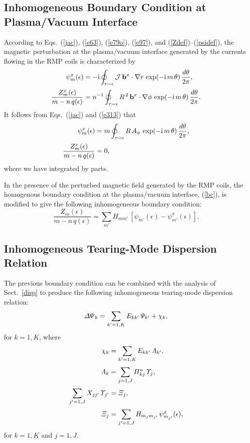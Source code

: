 \documentclass[12pt,prb,aps]{revtex4-1}
\begin{document}
\subsection{Inhomogeneous Boundary Condition at Plasma/Vacuum Interface}
According to Eqs.~(\ref{jac}), (\ref{e63}), (\ref{e79o}), (\ref{e97}), and (\ref{Zdef})--(\ref{psidef}), the magnetic perturbation at the plasma/vacuum
interface generated by the currents flowing in the RMP coils is characterized by
\begin{align}
\psi_m^x(\epsilon) &=-{\rm i}\oint_{r=\epsilon}{\cal J}\,{\bf b}^x\cdot\nabla r\,\exp(-{\rm i}\,m\,\theta)\,\frac{d\theta}{2\pi},\\[0.5ex]
\frac{Z_m^x(\epsilon)}{m-n\,q(\epsilon)}  &= n^{-1}\oint_{r=\epsilon}R^{\,2}\,{\bf b}^x\cdot\nabla \phi\,\exp(-{\rm i}\,m\,\theta)\,\frac{d\theta}{2\pi}.
\end{align}
It follows from Eqs.~(\ref{jac}) and (\ref{e313}) that
\begin{align}
\psi_m^x(\epsilon) &= m \oint_{r=\epsilon}R\,A_\phi\,\exp(-{\rm i}\,m\,\theta)\,\frac{d\theta}{2\pi},\\[0.5ex]
\frac{Z_m^x(\epsilon)}{m-n\,q(\epsilon)}  &= 0,
\end{align}
where we have integrated by parts. 

In the presence of the perturbed magnetic field generated by the RMP coils, the homogenous boundary condition at the plasma/vacuum
interface, (\ref{bc}), is modified to give the following inhomogeneous boundary condition:
\begin{equation}\label{bc1}
\frac{Z_m(\epsilon)}{m-n\,q(\epsilon)} = \sum_{m'} H_{mm'}\,[\psi_{m'}(\epsilon)-\psi_{m'}^x(\epsilon)].
\end{equation}

\subsection{Inhomogeneous Tearing-Mode Dispersion Relation}
The previous boundary condition can be combined with the analysis of Sect.~\ref{disp} to produce the following
inhomogeneous tearing-mode dispersion relation:\,\cite{am3,nelson}
\begin{equation}\label{disp1}
{\mit\Delta\Psi}_k = \sum_{k'=1,K} E_{kk'}\,{\mit\Psi}_{k'} + \chi_k,
\end{equation}
for $k=1,K$, where 
\begin{align}
\chi_k &= \sum_{k'=1,K}E_{kk'}\,{\mit \Lambda}_{k'},\\[0.5ex]
{\mit\Lambda}_{k} &= \sum_{j=1,J} {\mit\Pi}_{kj}^a\,{\mit\Upsilon}_{j},\\[0.5ex]
\sum_{j'=1,J} X_{jj'}\,{\mit\Upsilon}_{j'} &= {\mit\Xi}_{j},\\[0.5ex]
{\mit\Xi}_{j} &= \sum_{j'=1,J} H_{m_j m_{j'}}\,\psi_{m_{j'}}^x(\epsilon),
\end{align}
for $k=1,K$ and $j=1,J$. 
\end{document}
